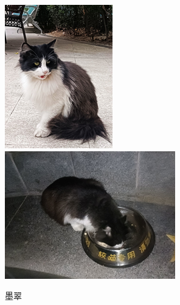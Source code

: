 \documentclass[zihao=-4,fontset=none]{Beautybook-CN}
\begin{document}
\begin{enumerate}
\begin{figure}[htbp]
            \centering
            \includegraphics[width=0.4\linewidth]{media/cimage26.png}
        \qquad
            \includegraphics[width=0.4\linewidth]{media/cimage27.png}
            \caption{墨翠}
            \label{img2627}
    \end{figure}
\end{enumerate}
\end{document}
